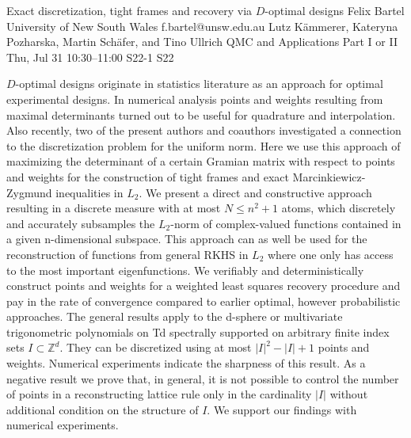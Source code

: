 \begin{talk}
  {Exact discretization, tight frames and recovery via $D$-optimal designs}%
  {Felix Bartel}%
  {University of New South Wales}%
  {f.bartel@unsw.edu.au}%
  {Lutz K\"ammerer, Kateryna Pozharska, Martin Sch\"afer, and Tino Ullrich}%
  {QMC and Applications Part I or II}%
  {Thu, Jul 31 10:30--11:00}%
  {S22-1}%
  {S22}%
    
   
    $D$-optimal designs originate in statistics literature as an approach for optimal experimental designs. In numerical analysis points and weights resulting from maximal determinants turned out to be useful for quadrature and interpolation. Also recently, two of the present authors and coauthors investigated a connection to the discretization problem for the uniform norm. Here we use this approach of maximizing the determinant of a certain Gramian matrix with respect to points and weights for the construction of tight frames and exact Marcinkiewicz-Zygmund inequalities in $L_2$. We present a direct and constructive approach resulting in a discrete measure with at most $N\le n^2+1$ atoms, which discretely and accurately subsamples the $L_2$-norm of complex-valued functions contained in a given n-dimensional subspace. This approach can as well be used for the reconstruction of functions from general RKHS in $L_2$ where one only has access to the most important eigenfunctions. We verifiably and deterministically construct points and weights for a weighted least squares recovery procedure and pay in the rate of convergence compared to earlier optimal, however probabilistic approaches. The general results apply to the d-sphere or multivariate trigonometric polynomials on Td spectrally supported on arbitrary finite index sets $I\subset\mathbb Z^d$. They can be discretized using at most $|I|^2-|I|+1$ points and weights. Numerical experiments indicate the sharpness of this result. As a negative result we prove that, in general, it is not possible to control the number of points in a reconstructing lattice rule only in the cardinality $|I|$ without additional condition on the structure of $I$. We support our findings with numerical experiments.

\medskip

\end{talk}

